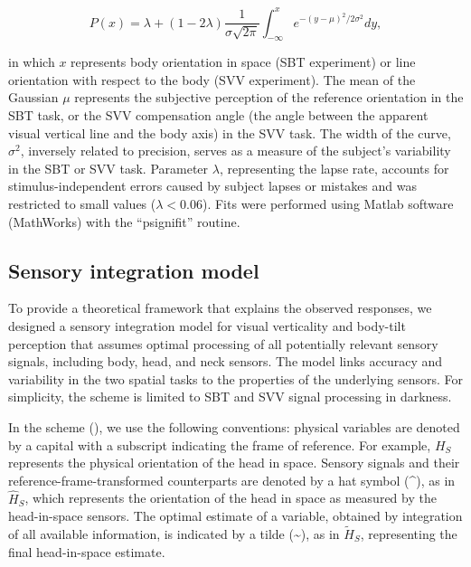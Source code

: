 \begin{equation}
\label{p1:eqn1}
P(x) = \lambda + (1 - 2\lambda) \frac{1}{\sigma \sqrt{2\pi}} \int_{-\infty}^{x}{e^{-(y-\mu)^2 / 2\sigma^2}}dy,
\end{equation}


in which $x$ represents body orientation in space (SBT experiment) or line orientation with respect to the body (SVV experiment). The mean of the Gaussian $\mu$ represents the subjective perception of the reference orientation in the SBT task, or the SVV compensation angle (the angle between the apparent visual vertical line and the body axis) in the SVV task. The width of the curve, $\sigma^2$, inversely related to precision, serves as a measure of the subject's variability in the SBT or SVV task. Parameter $\lambda$, representing the lapse rate, accounts for stimulus-independent errors caused by subject lapses or mistakes and was restricted to small values ($\lambda < 0.06$). Fits were performed using Matlab software (MathWorks) with the ``psignifit'' \cite{wichmann2001b} routine. 

\subsection{Sensory integration model}

To provide a theoretical framework that explains the observed responses, we designed a sensory integration model for visual verticality and body-tilt perception that assumes optimal processing of all potentially relevant sensory signals, including body, head, and neck sensors. The model links accuracy and variability in the two spatial tasks to the properties of the underlying sensors. For simplicity, the scheme is limited to SBT and SVV signal processing in darkness. 

In the scheme (), we use the following conventions: physical variables are denoted by a capital with a subscript indicating the frame of reference. For example, $H_S$ represents the physical orientation of the head in space. Sensory signals and their reference-frame-transformed counterparts are denoted by a hat symbol (\textasciicircum), as in $\hat{H}_{S}$, which represents the orientation of the head in space as measured by the head-in-space sensors. The optimal estimate of a variable, obtained by integration of all available information, is indicated by a tilde (\textasciitilde), as in $\tilde{H}_S$, representing the final head-in-space estimate. 

